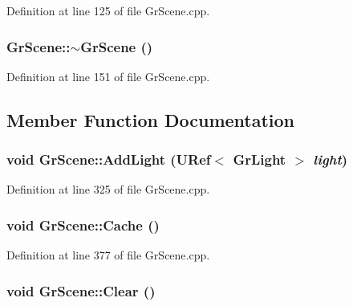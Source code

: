 Definition at line 125 of file GrScene.cpp.\hypertarget{class_gr_scene_282d695d3b86b54e68319f2297a2e8b4}{
\subsubsection[{$\sim$GrScene}]{\setlength{\rightskip}{0pt plus 5cm}GrScene::$\sim$GrScene ()}}
\label{class_gr_scene_282d695d3b86b54e68319f2297a2e8b4}




Definition at line 151 of file GrScene.cpp.

\subsection{Member Function Documentation}
\hypertarget{class_gr_scene_edba5aec2c8d98d63416dd3be618a427}{
\subsubsection[{AddLight}]{\setlength{\rightskip}{0pt plus 5cm}void GrScene::AddLight ({\bf URef}$<$ {\bf GrLight} $>$ {\em light})}}
\label{class_gr_scene_edba5aec2c8d98d63416dd3be618a427}




Definition at line 325 of file GrScene.cpp.\hypertarget{class_gr_scene_d0b2a12e012faf97823cab5067eb4fb0}{
\subsubsection[{Cache}]{\setlength{\rightskip}{0pt plus 5cm}void GrScene::Cache ()}}
\label{class_gr_scene_d0b2a12e012faf97823cab5067eb4fb0}




Definition at line 377 of file GrScene.cpp.\hypertarget{class_gr_scene_29e762ce8bc2054ff7564cbae4aafea5}{
\subsubsection[{Clear}]{\setlength{\rightskip}{0pt plus 5cm}void GrScene::Clear ()}}
\label{class_gr_scene_29e762ce8bc2054ff7564cbae4aafea5}




